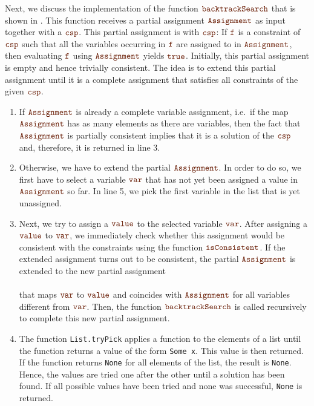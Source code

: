 Next, we discuss the implementation of the function $\mytt{backtrackSearch}$ that is shown in
.  This function receives a partial assignment 
$\mytt{Assignment}$ as input together with a $\mytt{csp}$.  This partial assignment is
 with $\mytt{csp}$:  If $\mytt{f}$ is a constraint of $\mytt{csp}$ such that
all the variables occurring in $\mytt{f}$ are assigned to in $\mytt{Assignment}$, then evaluating
$\mytt{f}$ using $\mytt{Assignment}$ yields $\mytt{true}$.  Initially, this partial assignment is empty
and hence trivially consistent.  The idea is to extend this partial assignment until it is a complete
assignment that satisfies all constraints of the given $\mytt{csp}$.
\begin{enumerate}
\item If $\mytt{Assignment}$ is already a complete variable assignment, i.e.~if the map
      $\mytt{Assignment}$ has as many elements as there are variables, then the fact that
      $\mytt{Assignment}$ is partially consistent implies that
      it is a solution of the $\mytt{csp}$ and, therefore, it is returned in line 3.
\item Otherwise, we have to extend the partial $\mytt{Assignment}$.  In order to do so, we first have to
      select a variable $\mytt{var}$ that has not yet been assigned a value in $\mytt{Assignment}$ so far.
      In line 5, we pick the first variable in the list  that is yet unassigned.
\item Next, we try to assign a $\mytt{value}$ to the selected variable $\mytt{var}$.  After assigning
      a $\mytt{value}$ to $\mytt{var}$, we immediately check whether this assignment would be consistent
      with the constraints using the function $\mytt{isConsistent}$.
      If the extended assignment turns out to be consistent, the partial $\mytt{Assignment}$
      is extended to the new partial assignment
      \\[0.2cm]
      \hspace*{1.3cm}
      \\[0.2cm]
      that maps $\mytt{var}$ to $\mytt{value}$ and coincides with $\mytt{Assignment}$ for all variables different
      from $\mytt{var}$.  Then, the function $\mytt{backtrackSearch}$ is called recursively to complete this new
      partial assignment.
\item The function \texttt{List.tryPick} applies a function to the elements of a list until the function returns a
      value of the form \texttt{Some x}.  This value is then returned.  If the function returns \texttt{None} for
      all elements of the list, the result is \texttt{None}.  Hence, the values are tried one after the other until
      a solution has been found.  If all possible values have been tried and none was successful,
      \texttt{None} is returned.
\end{enumerate}


